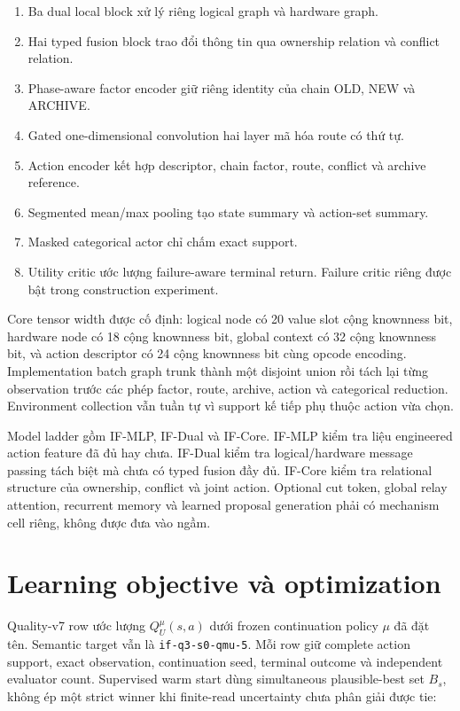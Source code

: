\documentclass[
  vietnamese,
  10pt,
  a4paper,
]{article}
\providecommand{\tightlist}{%
  \setlength{\itemsep}{0pt}\setlength{\parskip}{0pt}}
\begin{document}
\begin{enumerate}
\def\labelenumi{\arabic{enumi}.}
\tightlist
\item
  Ba dual local block xử lý riêng logical graph và hardware graph.
\item
  Hai typed fusion block trao đổi thông tin qua ownership relation và
  conflict relation.
\item
  Phase-aware factor encoder giữ riêng identity của chain OLD, NEW và
  ARCHIVE.
\item
  Gated one-dimensional convolution hai layer mã hóa route có thứ tự.
\item
  Action encoder kết hợp descriptor, chain factor, route, conflict và
  archive reference.
\item
  Segmented mean/max pooling tạo state summary và action-set summary.
\item
  Masked categorical actor chỉ chấm exact support.
\item
  Utility critic ước lượng failure-aware terminal return. Failure critic
  riêng được bật trong construction experiment.
\end{enumerate}

Core tensor width được cố định: logical node có 20 value slot cộng
knownness bit, hardware node có 18 cộng knownness bit, global context có
32 cộng knownness bit, và action descriptor có 24 cộng knownness bit
cùng opcode encoding. Implementation batch graph trunk thành một
disjoint union rồi tách lại từng observation trước các phép factor,
route, archive, action và categorical reduction. Environment collection
vẫn tuần tự vì support kế tiếp phụ thuộc action vừa chọn.

Model ladder gồm IF-MLP, IF-Dual và IF-Core. IF-MLP kiểm tra liệu
engineered action feature đã đủ hay chưa. IF-Dual kiểm tra
logical/hardware message passing tách biệt mà chưa có typed fusion đầy
đủ. IF-Core kiểm tra relational structure của ownership, conflict và
joint action. Optional cut token, global relay attention, recurrent
memory và learned proposal generation phải có mechanism cell riêng,
không được đưa vào ngầm.

\section{Learning objective và
optimization}\label{learning-objective-vuxe0-optimization}

Quality-v7 row ước lượng \(Q_U^\mu(s,a)\) dưới frozen continuation
policy \(\mu\) đã đặt tên. Semantic target vẫn là
\texttt{if-q3-s0-qmu-5}. Mỗi row giữ complete action support, exact
observation, continuation seed, terminal outcome và independent
evaluator count. Supervised warm start dùng simultaneous plausible-best
set \(B_s\), không ép một strict winner khi finite-read uncertainty chưa
phân giải được tie:
\end{document}
